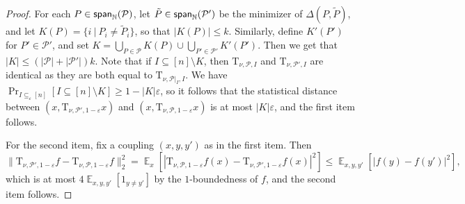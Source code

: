 \documentclass[10pt,a4paper]{amsart}
\newcommand\card[1]{\left| {#1} \right|}
\newcommand\Prob[2]{{\Pr_{#1}\left[ {#2} \right]}}
\newcommand\norm[1]{\| #1 \|}
\newcommand\Expect[2]{{\mathop{\mathbb{E}}_{#1}\left[ {#2} \right]}}
\newcommand\spn{{\sf span}_{\mathbb{N}}}
\newcommand\eps{\varepsilon}
\renewcommand\geq{\geqslant}
\renewcommand\leq{\leqslant}
\begin{document}
\begin{proof}
    For each $P\in \spn(\mathcal{P})$, let $\tilde{P}\in\spn(\mathcal{P}')$ be the minimizer of $\Delta(P,\tilde{P})$, and let $K(P) = \{i~|~P_i\neq \tilde{P}_i\}$, so that $\card{K(P)}\leq k$. Similarly, define $K'(P')$ for $P'\in\mathcal{P}'$, and set $K = \bigcup_{P\in\mathcal{P}}K(P)\cup \bigcup_{P'\in\mathcal{P}'}K'(P')$. Then we get that $\card{K}\leq (\card{\mathcal{P}}+|\mathcal{P}'|)k$. Note that if $I\subseteq [n]\setminus K$, then $\mathrm{T}_{\nu,\mathcal{P},I}$ and $\mathrm{T}_{\nu,\mathcal{P}',I}$ are identical as they are both equal to $\mathrm{T}_{\nu,\mathcal{P}|_{I},I}$. We have $\Prob{I\subseteq_{\eps}[n]}{I\subseteq [n]\setminus K}\geq 1-\card{K}\eps$, so it follows that the statistical distance between $(x, \mathrm{T}_{\nu, \mathcal{P}', 1-\eps}x)$ and 
    $(x, \mathrm{T}_{\nu, \mathcal{P}, 1-\eps}x)$ is at most $\card{K}\eps$, and the first item follows.

    For the second item, fix a coupling $(x,y,y')$ as in the first item. Then
    \[
    \norm{\mathrm{T}_{\nu, \mathcal{P}', 1-\eps} f - \mathrm{T}_{\nu, \mathcal{P}, 1-\eps} f}_2^2
    =\Expect{x}{
    \card{\mathrm{T}_{\nu, \mathcal{P}, 1-\eps} f(x)
    -\mathrm{T}_{\nu, \mathcal{P}', 1-\eps} f(x)}^2}
    \leq \Expect{x,y,y'}{\card{f(y)-f(y')}^2},
    \]
    which is at most $4\Expect{x,y,y'}{1_{y\neq y'}}$ by the $1$-boundedness of $f$, and the second item follows.
\end{proof}
\end{document}
